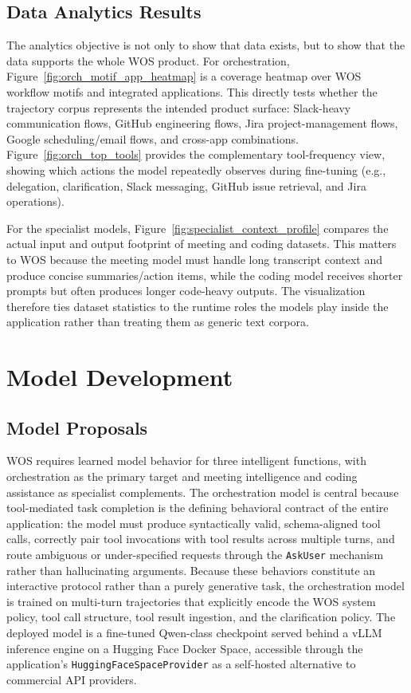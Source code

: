\documentclass[conference]{IEEEtran}
\begin{document}
\subsection{Data Analytics Results}
The analytics objective is not only to show that data exists, but to show that the data supports the whole WOS product. For orchestration, Figure~\ref{fig:orch_motif_app_heatmap} is a coverage heatmap over WOS workflow motifs and integrated applications. This directly tests whether the trajectory corpus represents the intended product surface: Slack-heavy communication flows, GitHub engineering flows, Jira project-management flows, Google scheduling/email flows, and cross-app combinations. Figure~\ref{fig:orch_top_tools} provides the complementary tool-frequency view, showing which actions the model repeatedly observes during fine-tuning (e.g., delegation, clarification, Slack messaging, GitHub issue retrieval, and Jira operations).

For the specialist models, Figure~\ref{fig:specialist_context_profile} compares the actual input and output footprint of meeting and coding datasets. This matters to WOS because the meeting model must handle long transcript context and produce concise summaries/action items, while the coding model receives shorter prompts but often produces longer code-heavy outputs. The visualization therefore ties dataset statistics to the runtime roles the models play inside the application rather than treating them as generic text corpora.

\section{Model Development} \label{sec:model_dev}
\subsection{Model Proposals}
WOS requires learned model behavior for three intelligent functions, with orchestration as the primary target and meeting intelligence and coding assistance as specialist complements. The orchestration model is central because tool-mediated task completion is the defining behavioral contract of the entire application: the model must produce syntactically valid, schema-aligned tool calls, correctly pair tool invocations with tool results across multiple turns, and route ambiguous or under-specified requests through the \texttt{AskUser} mechanism rather than hallucinating arguments. Because these behaviors constitute an interactive protocol rather than a purely generative task, the orchestration model is trained on multi-turn trajectories that explicitly encode the WOS system policy, tool call structure, tool result ingestion, and the clarification policy. The deployed model is a fine-tuned Qwen-class checkpoint served behind a vLLM inference engine on a Hugging Face Docker Space, accessible through the application's \texttt{HuggingFaceSpaceProvider} as a self-hosted alternative to commercial API providers.
\end{document}
